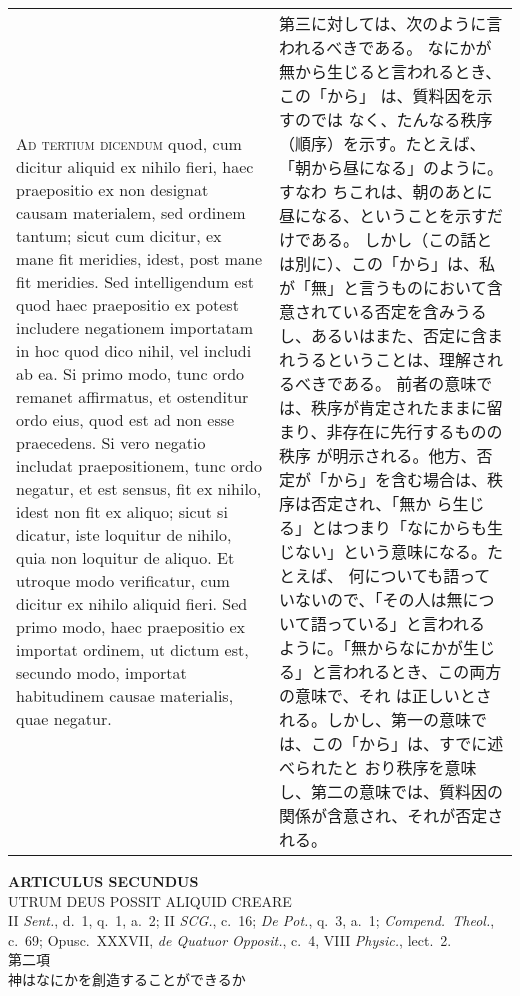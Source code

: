 \documentclass[10pt]{jsarticle} %
\begin{document}
\begin{longtable}{p{21em}p{21em}}
{\scshape Ad tertium dicendum} quod, cum dicitur aliquid
 ex nihilo fieri, haec praepositio ex non designat causam materialem,
 sed ordinem tantum; sicut cum dicitur, ex mane fit meridies, idest,
 post mane fit meridies. Sed intelligendum est quod haec praepositio ex
 potest includere negationem importatam in hoc quod dico nihil, vel
 includi ab ea. Si primo modo, tunc ordo remanet affirmatus, et
 ostenditur ordo eius, quod est ad non esse praecedens. Si vero negatio
 includat praepositionem, tunc ordo negatur, et est sensus, fit ex
 nihilo, idest non fit ex aliquo; sicut si dicatur, iste loquitur de
 nihilo, quia non loquitur de aliquo. Et utroque modo verificatur, cum
 dicitur ex nihilo aliquid fieri. Sed primo modo, haec praepositio ex
 importat ordinem, ut dictum est, secundo modo, importat habitudinem
 causae materialis, quae negatur.

&
第三に対しては、次のように言われるべきである。
なにかが無から生じると言われるとき、この「から」 は、質料因を示すのでは
 なく、たんなる秩序（順序）を示す。たとえば、「朝から昼になる」のように。すなわ
 ちこれは、朝のあとに昼になる、ということを示すだけである。
しかし（この話とは別に）、この「から」は、私が「無」と言うものにおいて含
 意されている否定を含みうるし、あるいはまた、否定に含まれうるということは、理解されるべきである。
前者の意味では、秩序が肯定されたままに留まり、非存在に先行するものの秩序
 が明示される。他方、否定が「から」を含む場合は、秩序は否定され、「無か
 ら生じる」とはつまり「なにからも生じない」という意味になる。たとえば、
何についても語っていないので、「その人は無について語っている」と言われる
 ように。「無からなにかが生じる」と言われるとき、この両方の意味で、それ
 は正しいとされる。しかし、第一の意味では、この「から」は、すでに述べられたと
 おり秩序を意味し、第二の意味では、質料因の関係が含意され、それが否定さ
 れる。


\end{longtable}




\newpage
{}
\begin{center}
 {\Large {\bf ARTICULUS SECUNDUS}}\\
 {\large UTRUM DEUS POSSIT ALIQUID CREARE}\\
 {\footnotesize II {\itshape Sent.}, d.~1, q.~1, a.~2; II {\itshape
 SCG.}, c.~16; {\itshape De Pot.}, q.~3, a.~1; {\itshape
 Compend.~Theol.}, c.~69; Opusc.~XXXVII, {\itshape de Quatuor Opposit.},
 c.~4, VIII {\itshape Physic.}, lect.~2.}\\
 {\Large 第二項\\神はなにかを創造することができるか}
\end{center}
\end{document}
